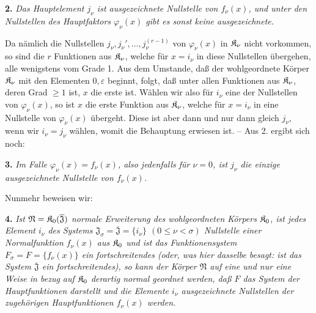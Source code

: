 \textbf{2.} \emph{Das Hauptelement $j_\nu$ ist ausgezeichnete Nullstelle von $f_\nu(x)$, und unter den Nullstellen des Hauptfaktors $\varphi_\nu(x)$ gibt es sonst keine ausgezeichnete.}

Da nämlich die Nullstellen $j_\nu,j_\nu',\ldots,j_\nu^{(r-1)}$ von $\varphi_\nu(x)$ in $\mathfrak K_\nu$ nicht vorkommen, so sind die $r$ Funktionen aus $\mathfrak K_\nu$, welche für $x=i_\nu$ in diese Nullstellen übergehen, alle wenigstens vom Grade 1. Aus dem Umstande, daß der wohlgeordnete Körper $\mathfrak K_\nu$ mit den Elementen $0,\varepsilon$ beginnt, folgt, daß unter allen Funktionen aus $\mathfrak K_\nu$, deren Grad $\geq1$ ist, $x$ die erste ist. Wählen wir also für $i_\nu$ eine der Nullstellen von $\varphi_\nu(x)$, so ist $x$ die erste Funktion aus $\mathfrak K_\nu$, welche für $x=i_\nu$ in eine Nullstelle von $\varphi_\nu(x)$ übergeht. Diese ist aber dann und nur dann gleich $j_\nu$, wenn wir $i_\nu=j_\nu$ wählen, womit die Behauptung erwiesen ist. -- Aus 2. ergibt sich noch:

\textbf{3.} \emph{Im Falle $\varphi_\nu(x)=f_\nu(x)$, also jedenfalls für $\nu=0$, ist $j_\nu$ die einzige ausgezeichnete Nullstelle von $f_\nu(x)$.}

Nunmehr beweisen wir:

\textbf{4.} \emph{Ist $\mathfrak N=\mathfrak K_0(\overline{\mathfrak J})$ normale Erweiterung des wohlgeordneten Körpers $\mathfrak K_0$, ist jedes Element $i_\nu$ des Systems $\mathfrak J_\sigma=\overline{\mathfrak J}=\{i_\nu\}$ $(0\leq\nu<\sigma)$ Nullstelle einer Normalfunktion $f_\nu(x)$ aus $\mathfrak K_0$ und ist das Funktionensystem $F_\sigma=F=\{f_\nu(x)\}$ ein fortschreitendes (oder, was hier dasselbe besagt: ist das System $\overline{\mathfrak J}$ ein fortschreitendes), so kann der Körper $\mathfrak N$ auf eine und nur eine Weise in bezug auf $\mathfrak K_0$ derartig normal geordnet werden, daß $F$ das System der Hauptfunktionen darstellt und die Elemente $i_\nu$ ausgezeichnete Nullstellen der zugehörigen Hauptfunktionen $f_\nu(x)$ werden.}

